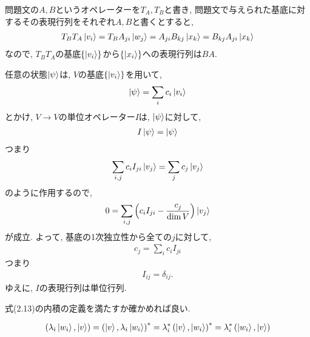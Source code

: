 \begin{ex}
    \label{ex2.1}
    問題文の$A,B$というオペレーターを$T_A, T_B$と書き, 問題文で与えられた基底に対するその表現行列をそれぞれ$A,B$と書くとすると,
    \begin{align*}
        T_B T_A \ket{v_i}
        = T_B A_{ji}\ket{w_j}
        = A_{ji} B_{kj} \ket{x_k}
        = B_{kj} A_{ji} \ket{x_k}
    \end{align*}
    なので, $T_BT_A$の基底$\{\ket{v_i}\}$から$\{\ket{x_i}\}$への表現行列は$BA$.
\end{ex}

\begin{ex}
    \label{ex2.4}
    任意の状態$\ket{\psi}$は, $V$の基底$\{\ket{v_i}\}$を用いて,
    \begin{align*}
        \ket{\psi} = \sum_i c_i \ket{v_i}
    \end{align*}
    とかけ,
    $V \to V$の単位オペレーター$I$は, $\ket{\psi}$に対して,
    \begin{align*}
        I \ket{\psi} = \ket{\psi}
    \end{align*}
    つまり
    \begin{align*}
        \sum_{i,j} c_i I_{ji} \ket{v_j} = \sum_{j} c_j \ket{v_j}
    \end{align*}
    のように作用するので,
    \begin{align*}
        0 =
        \sum_{i,j} \left( c_i I_{ji} - \frac{c_j}{\dim V} \right) \ket{v_j}
    \end{align*}
    が成立. よって, 基底の1次独立性から全ての$j$に対して,
    \begin{align*}
        c_j = \sum_i c_i I_{ji}
    \end{align*}
    つまり
    \begin{align*}
        I_{ij} = \delta_{ij}.
    \end{align*}
    ゆえに, $I$の表現行列は単位行列.
\end{ex}

\begin{ex}
    \label{ex2.5}
    式(2.13)の内積の定義を満たすか確かめれば良い.
\end{ex}

\begin{ex}
    \label{ex2.6}
    \begin{align*}
        \left(
        \lambda_i \ket{w_i} , \ket{v}
        \right)
        =
        \left(
        \ket{v},
        \lambda_i \ket{w_i}
        \right)^*
        =
        \lambda_i^*
        \left(
        \ket{v},\ket{w_i}
        \right)^*
        =
        \lambda_i^*
        \left(
        \ket{w_i},\ket{v}
        \right)
    \end{align*}
\end{ex}

